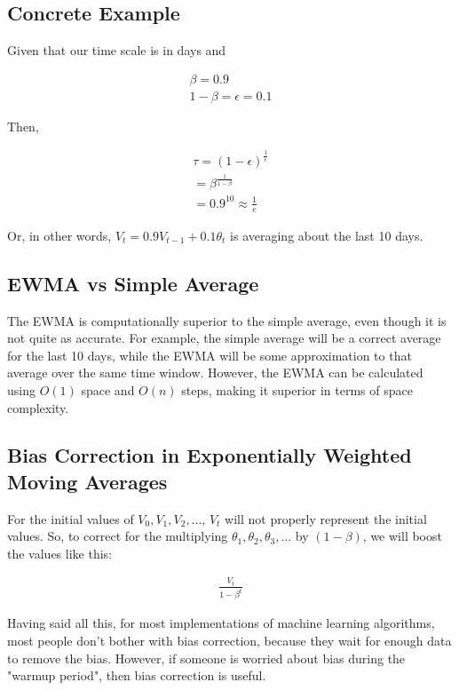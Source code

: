 \documentclass{article}
\begin{document}
\subsection{Concrete Example}

Given that our time scale is in days and

\begin{align}
\beta = 0.9 \\
1-\beta = \epsilon = 0.1
\end{align}

Then,

\begin{align}
\tau = (1 - \epsilon)^\frac{1}{\epsilon} \\
= \beta^\frac{1}{1-\beta} \\
= 0.9^{10} \approx \frac{1}{e}
\end{align}

Or, in other words, $V_t = 0.9 V_{t-1} + 0.1 \theta_t$ is averaging about the last 10 days.

\subsection{EWMA vs Simple Average}

The EWMA is computationally superior to the simple average, even though it is not quite as accurate.  For example, the simple average will be a correct average for the last 10 days, while the EWMA will be some approximation to that average over the same time window.  However, the EWMA can be calculated using $O(1)$ space and $O(n)$ steps, making it superior in terms of space complexity.

\subsection{Bias Correction in Exponentially Weighted Moving Averages}

For the initial values of $V_0, V_1, V_2, ...$, $V_t$ will not properly represent the initial values.  So, to correct for the multiplying $\theta_1, \theta_2, \theta_3, ...$ by $(1-\beta)$, we will boost the values like this:

\begin{align}
\frac{V_t}{1-\beta^t}
\end{align}

Having said all this, for most implementations of machine learning algorithms, most people don't bother with bias correction, because they wait for enough data to remove the bias.  However, if someone is worried about bias during the "warmup period", then bias correction is useful.
\end{document}
